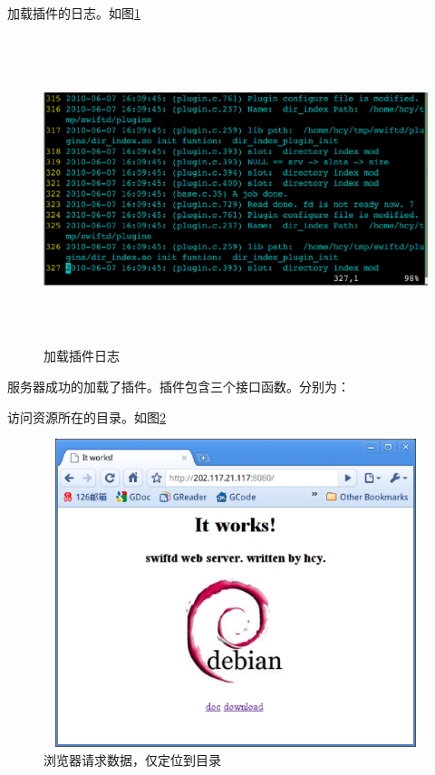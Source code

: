 \documentclass[12pt, twoside, a4paper, xetex]{report}
\begin{document}
	加载插件的日志。如图\ref{loadpluginlog}
	\begin{figure}[htbp]
	\centering
	\setlength{\abovecaptionskip}{0pt}
	\setlength{\belowcaptionskip}{10pt}
	\caption{加载插件日志}
	\label{loadpluginlog}
	\includegraphics[height=9cm, width=15cm]{pics/loadpluginlog.eps}
	\end{figure}
	
	服务器成功的加载了插件。插件包含三个接口函数。分别为：
	
	访问资源所在的目录。如图\ref{access2}
	\begin{figure}[htbp]
	\centering
	\setlength{\abovecaptionskip}{0pt}
	\setlength{\belowcaptionskip}{10pt}
	\caption{浏览器请求数据，仅定位到目录}
	\label{access2}
	\includegraphics[height=9cm, width=12cm]{pics/access2.eps}
	\end{figure}
	
\end{document}
